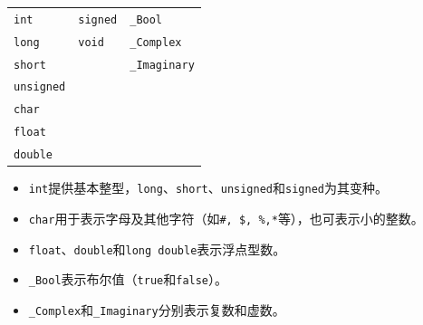 \begin{frame}
\begin{table}
\centering
\begin{tabular}{p{3cm}|p{3cm}|p{3cm}}\hline
\lstinline|int| & \lstinline|signed| & \lstinline|_Bool| \\[0.05in]
\lstinline|long| & \lstinline|void| & \lstinline|_Complex| \\[0.05in]
\lstinline|short| & & \lstinline|_Imaginary|\\[0.05in]
\lstinline|unsigned| &&\\[0.05in]
\lstinline|char| &&\\[0.05in]
\lstinline|float| &&\\[0.05in]
\lstinline|double| &&\\\hline
\end{tabular}
\end{table}
\end{frame}

\begin{frame}[fragile]
\begin{itemize}
\item 
\lstinline|int|提供基本整型，\lstinline|long|、\lstinline|short|、\lstinline|unsigned|和\lstinline|signed|为其变种。\\[0.1in]
\item
\lstinline|char|用于表示字母及其他字符（如\lstinline|#, $, %,*|等），也可表示小的整数。\\[0.1in]
\item
\lstinline|float|、\lstinline|double|和\lstinline|long double|表示浮点型数。\\[0.1in]
\item \lstinline|_Bool|表示布尔值（\lstinline|true|和\lstinline|false|）。\\[0.1in]
\item \lstinline|_Complex|和\lstinline|_Imaginary|分别表示复数和虚数。\\[0.2in]
\end{itemize}
\end{frame}





